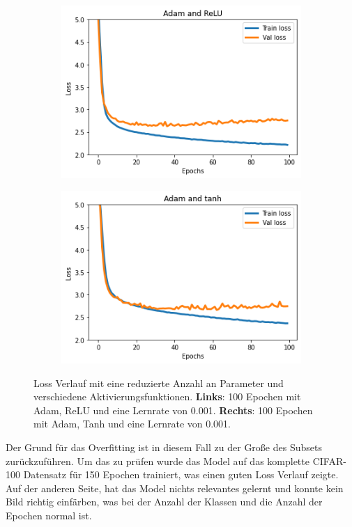 \begin{figure}[H]
  \centering
  \vspace{1cm}
  \begin{subfigure}
    \centering
    \includegraphics[width=.48\textwidth]{resources/experiments/cifar-adam-relu.png}
  \end{subfigure}
  \begin{subfigure}
    \centering
    \includegraphics[width=.48\textwidth]{resources/experiments/cifar-adam-tanh-100.png}
  \end{subfigure}

  \caption{Loss Verlauf mit eine reduzierte Anzahl an Parameter und verschiedene Aktivierungsfunktionen. 
  \textbf{Links}: 100 Epochen mit Adam, ReLU und eine Lernrate von 0.001. \textbf{Rechts}: 100 Epochen mit Adam, Tanh und eine Lernrate von 0.001.}
  \label{image:gute-ergebnisse-cifar}
\end{figure}

Der Grund für das Overfitting ist in diesem Fall zu der Große des Subsets zurückzuführen. Um das zu prüfen wurde das Model auf das komplette CIFAR-100
Datensatz für 150 Epochen trainiert, was einen guten Loss Verlauf zeigte. Auf der anderen Seite, hat das Model nichts relevantes gelernt und 
konnte kein Bild richtig einfärben, was bei der Anzahl der Klassen und die Anzahl der Epochen normal ist.

